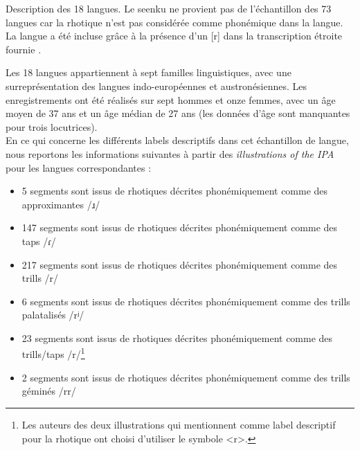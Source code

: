 \begin{table}
	\centering
	
	\caption[Description des 18 langues.]{Description des 18 langues. Le seenku ne provient pas de l'échantillon des 73 langues car la rhotique n'est pas considérée comme phonémique dans la langue. La langue a été incluse grâce à la présence d'un [r] dans la transcription étroite fournie \parencite[18]{mcphersonSeenku2019}.}
	\label{tab:description18langues}
\end{table}

Les 18 langues appartiennent à sept familles linguistiques, avec une surreprésentation des langues indo-européennes et austronésiennes. Les enregistrements ont été réalisés sur sept hommes et onze femmes, avec un âge moyen de 37 ans et un âge médian de 27 ans (les données d'âge sont manquantes pour trois locutrices).\\


En ce qui concerne les différents labels descriptifs dans cet échantillon de langue, nous reportons les informations suivantes à partir des \textit{illustrations of the IPA} pour les langues correspondantes :

\begin{itemize}
	\item 5 segments sont issus de rhotiques décrites phonémiquement comme des approximantes /ɹ/
	\item 147 segments sont issus de rhotiques décrites phonémiquement comme des taps /ɾ/
	\item 217 segments sont issus de rhotiques décrites phonémiquement comme des trills /r/
	\item 6 segments sont issus de rhotiques décrites phonémiquement comme des trills palatalisés /rʲ/
	\item 23 segments sont issus de rhotiques décrites phonémiquement comme des trills/taps /r/\footnote{Les auteurs des deux illustrations qui mentionnent  comme label descriptif pour la rhotique ont choisi d'utiliser le symbole <r>.}
	\item 2 segments sont issus de rhotiques décrites phonémiquement comme des trills géminés /rr/
\end{itemize}

